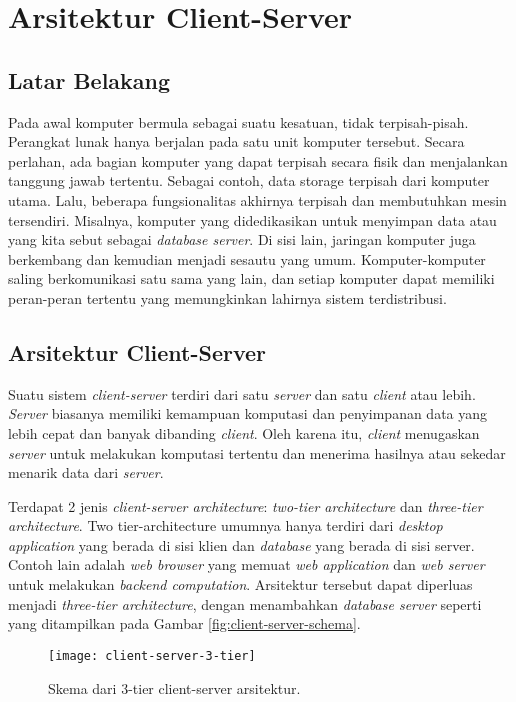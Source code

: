 \chapter{Arsitektur Client-Server}

\section{Latar Belakang}
Pada awal komputer bermula sebagai suatu kesatuan, tidak terpisah-pisah. Perangkat lunak hanya berjalan pada satu unit komputer tersebut. Secara perlahan, ada bagian komputer yang dapat terpisah secara fisik dan menjalankan tanggung jawab tertentu. Sebagai contoh, data storage terpisah dari komputer utama. Lalu, beberapa fungsionalitas akhirnya terpisah dan membutuhkan mesin tersendiri. Misalnya, komputer yang didedikasikan untuk menyimpan data atau yang kita sebut sebagai \textit{database server}. Di sisi lain, jaringan komputer juga berkembang dan kemudian menjadi sesautu yang umum. Komputer-komputer saling berkomunikasi satu sama yang lain, dan setiap komputer dapat memiliki peran-peran tertentu yang memungkinkan lahirnya sistem terdistribusi.

\section{Arsitektur Client-Server}
Suatu sistem \textit{client-server} terdiri dari satu \textit{server} dan satu \textit{client} atau lebih. \textit{Server} biasanya memiliki kemampuan komputasi dan penyimpanan data yang lebih cepat dan banyak dibanding \textit{client}. Oleh karena itu, \textit{client} menugaskan \textit{server} untuk melakukan komputasi tertentu dan menerima hasilnya atau sekedar menarik data dari \textit{server}.

Terdapat 2 jenis \textit{client-server architecture}: \textit{two-tier architecture} dan \textit{three-tier architecture}. Two tier-architecture umumnya hanya terdiri dari \textit{desktop application} yang berada di sisi klien dan \textit{database} yang berada di sisi server. Contoh lain adalah \textit{web browser} yang memuat \textit{web application} dan \textit{web server} untuk melakukan \textit{backend computation}.
Arsitektur tersebut dapat diperluas menjadi \textit{three-tier architecture}, dengan menambahkan \textit{database server} seperti yang ditampilkan pada Gambar \ref{fig:client-server-schema}.

\begin{figure}[h]
    \centering
    \texttt{[image: client-server-3-tier]}
    \caption{Skema dari 3-tier client-server arsitektur.}
    \label{fig:client-server-schema_2}
\end{figure}

